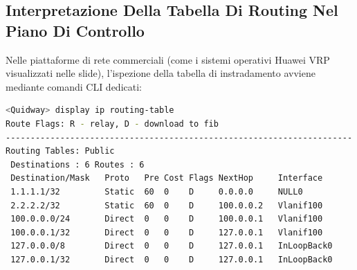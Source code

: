 \documentclass[11pt, a4paper]{article}
\begin{document}
\subsection{Interpretazione Della Tabella Di Routing Nel Piano Di Controllo}

Nelle piattaforme di rete commerciali (come i sistemi operativi Huawei VRP visualizzati nelle slide), l'ispezione della tabella di instradamento avviene mediante comandi CLI dedicati:

\begin{lstlisting}[language=bash, caption={Output del comando display ip routing-table.}]
<Quidway> display ip routing-table
Route Flags: R - relay, D - download to fib
----------------------------------------------------------------------
Routing Tables: Public
 Destinations : 6 Routes : 6
 Destination/Mask   Proto   Pre Cost Flags NextHop     Interface
 1.1.1.1/32         Static  60  0    D     0.0.0.0     NULL0
 2.2.2.2/32         Static  60  0    D     100.0.0.2   Vlanif100
 100.0.0.0/24       Direct  0   0    D     100.0.0.1   Vlanif100
 100.0.0.1/32       Direct  0   0    D     127.0.0.1   Vlanif100
 127.0.0.0/8        Direct  0   0    D     127.0.0.1   InLoopBack0
 127.0.0.1/32       Direct  0   0    D     127.0.0.1   InLoopBack0
\end{lstlisting}

\end{document}
